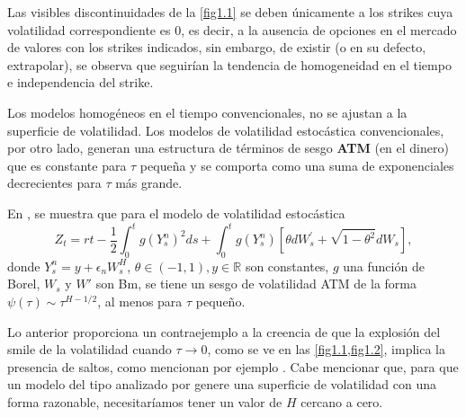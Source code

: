 \documentclass[letterpaper,12pt,oneside]{book}
\theoremstyle{plain}
\numberwithin{theorem}{section}
\begin{document}
Las visibles discontinuidades de la \cref{fig1.1} se deben únicamente a los strikes cuya volatilidad correspondiente es $0$, es decir, a la ausencia de opciones en el mercado de valores con los strikes indicados, sin embargo, de existir (o en su defecto, extrapolar), se observa que seguirían la tendencia de homogeneidad en el tiempo e independencia del strike.

Los modelos homogéneos en el tiempo convencionales, no se ajustan a la superficie de volatilidad. Los modelos de volatilidad estocástica convencionales, por otro lado, generan una estructura de términos de sesgo \textbf{ATM} (en el dinero) que es constante para $\tau$ pequeña y se comporta como una suma de exponenciales decrecientes para $\tau$ más grande.%

En \cite{fukasawa_asymptotic_2011}, se muestra que para el modelo de volatilidad estocástica
$$Z_{t}=r t-\frac{1}{2} \int_{0}^{t} g\left(Y_{s}^{n}\right)^{2} d s+\int_{0}^{t} g\left(Y_{s}^{n}\right)\left[\theta d W_{s}^{\prime}+\sqrt{1-\theta^{2}} d W_{s}\right],$$
donde $Y_s^n=y+\epsilon_nW_s^H$, $\theta\in(-1,1), y\in\mathbb R$ son constantes, $g$ una función de Borel, $W_s$ y $W'$ son Bm, se tiene un sesgo de volatilidad ATM de la forma $\psi(\tau)\sim \tau^{H -1/2}$, al menos para $\tau$ pequeño.

Lo anterior proporciona un contraejemplo a la creencia de que la explosión del smile de la volatilidad cuando $\tau\rightarrow 0$, como se ve en las \cref{fig1.1,fig1.2}, implica la presencia de saltos, como mencionan por ejemplo \cite{carr_what_2003}. Cabe mencionar que, para que un modelo del tipo analizado por \cite{fukasawa_asymptotic_2011} genere una superficie de volatilidad con una forma razonable, necesitaríamos tener un valor de $H$ cercano a cero.
\end{document}
